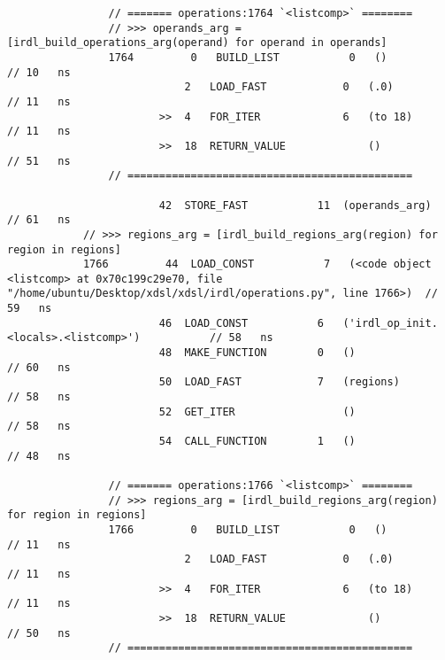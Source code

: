 \begin{code}
\begin{verbatim}
                // ======= operations:1764 `<listcomp>` ========
                // >>> operands_arg = [irdl_build_operations_arg(operand) for operand in operands]
                1764         0   BUILD_LIST           0   ()                                        // 10   ns
                            2   LOAD_FAST            0   (.0)                                       // 11   ns
                        >>  4   FOR_ITER             6   (to 18)                                    // 11   ns
                        >>  18  RETURN_VALUE             ()                                         // 51   ns
                // =============================================

                        42  STORE_FAST           11  (operands_arg)                                 // 61   ns
            // >>> regions_arg = [irdl_build_regions_arg(region) for region in regions]
            1766         44  LOAD_CONST           7   (<code object <listcomp> at 0x70c199c29e70, file "/home/ubuntu/Desktop/xdsl/xdsl/irdl/operations.py", line 1766>)  // 59   ns
                        46  LOAD_CONST           6   ('irdl_op_init.<locals>.<listcomp>')           // 58   ns
                        48  MAKE_FUNCTION        0   ()                                             // 60   ns
                        50  LOAD_FAST            7   (regions)                                      // 58   ns
                        52  GET_ITER                 ()                                             // 58   ns
                        54  CALL_FUNCTION        1   ()                                             // 48   ns

                // ======= operations:1766 `<listcomp>` ========
                // >>> regions_arg = [irdl_build_regions_arg(region) for region in regions]
                1766         0   BUILD_LIST           0   ()                                        // 11   ns
                            2   LOAD_FAST            0   (.0)                                       // 11   ns
                        >>  4   FOR_ITER             6   (to 18)                                    // 11   ns
                        >>  18  RETURN_VALUE             ()                                         // 50   ns
                // =============================================


\end{verbatim}
\end{code}

